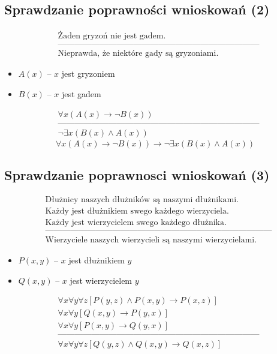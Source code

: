 \documentclass[12pt]{article}
\begin{document}
\subsection{Sprawdzanie poprawności wnioskowań (2)}
%
\begin{eqnarray*}
& \textrm{Żaden gryzoń nie jest gadem.} \nonumber \\
& \textrm{------------------------------------------------------------------------}\nonumber \\
& \textrm{Nieprawda, że niektóre gady są gryzoniami.}
\end{eqnarray*}
%
\begin{itemize}
\item $A(x)$ -- $x$ jest gryzoniem
\item $B(x)$ -- $x$ jest gadem
\end{itemize}
%
\begin{eqnarray*}
& \forall x (A(x) \to \neg B(x)) \nonumber \\
& \textrm{------------------------------------------------------------------------}\nonumber \\
& \neg \exists x (B(x) \land A(x))
\end{eqnarray*}
%
$$\forall x (A(x) \to \neg B(x)) \to \neg \exists x (B(x) \land A(x))$$
%

\subsection{Sprawdzanie poprawnosci wnioskowań (3)}
%
\begin{eqnarray*}
& \textrm{Dłużnicy naszych dłużników są naszymi dłużnikami.}\nonumber \\
& \textrm{Każdy jest dłużnikiem swego każdego wierzyciela.}\nonumber \\
& \textrm{Każdy jest wierzycielem swego każdego dłużnika.}\nonumber \\
& \textrm{---------------------------------------------------------------------------------}\nonumber \\
& \textrm{Wierzyciele naszych wierzycieli są naszymi wierzycielami.}
\end{eqnarray*}
%
\begin{itemize}
\item $P(x,y)$ -- $x$ jest dłużnikiem $y$
\item$Q(x,y)$ -- $x$ jest wierzycielem $y$
\end{itemize}
%
\begin{eqnarray*}
& \forall x \forall y \forall z [P(y,z) \land P(x,y) \to P(x,z)] \nonumber \\
& \forall x \forall y [Q(x,y) \to P(y,x)] \nonumber \\
& \forall x \forall y [P(x,y) \to Q(y,x)] \nonumber \\
& \textrm{------------------------------------------------------------------------}\nonumber \\
& \forall x \forall y \forall z [Q(y,z) \land Q(x,y) \to Q(x,z)] \nonumber \\
\end{eqnarray*}
%
\end{document}
